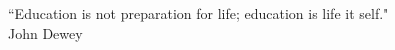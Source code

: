 \begin{epigrafe}
    \vspace*{\fill}
	\begin{flushright}
	    \parbox{0.6\linewidth}{
		“Education is not preparation for life; education is life it self." \\
		
		John Dewey
	}
	\end{flushright}
	\vspace{2cm}
\end{epigrafe}